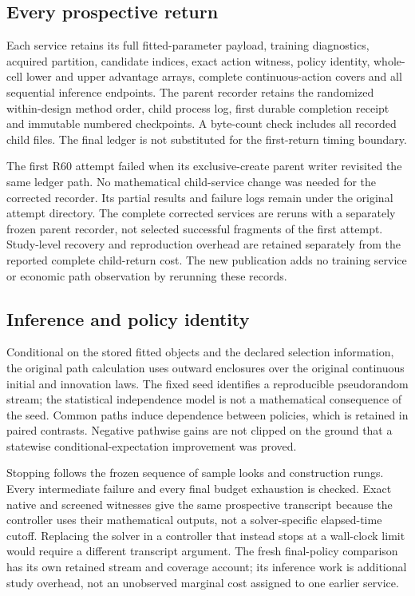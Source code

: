 \subsection{Every prospective return}

Each service retains its full fitted-parameter payload, training diagnostics, acquired partition, candidate indices, exact action witness, policy identity, whole-cell lower and upper advantage arrays, complete continuous-action covers and all sequential inference endpoints. The parent recorder retains the randomized within-design method order, child process log, first durable completion receipt and immutable numbered checkpoints. A byte-count check includes all recorded child files. The final ledger is not substituted for the first-return timing boundary.

The first R60 attempt failed when its exclusive-create parent writer revisited the same ledger path. No mathematical child-service change was needed for the corrected recorder. Its partial results and failure logs remain under the original attempt directory. The complete corrected services are reruns with a separately frozen parent recorder, not selected successful fragments of the first attempt. Study-level recovery and reproduction overhead are retained separately from the reported complete child-return cost. The new publication adds no training service or economic path observation by rerunning these records.

\subsection{Inference and policy identity}
Conditional on the stored fitted objects and the declared selection information, the original path calculation uses outward enclosures over the original continuous initial and innovation laws. The fixed seed identifies a reproducible pseudorandom stream; the statistical independence model is not a mathematical consequence of the seed. Common paths induce dependence between policies, which is retained in paired contrasts. Negative pathwise gains are not clipped on the ground that a statewise conditional-expectation improvement was proved.

Stopping follows the frozen sequence of sample looks and construction rungs. Every intermediate failure and every final budget exhaustion is checked. Exact native and screened witnesses give the same prospective transcript because the controller uses their mathematical outputs, not a solver-specific elapsed-time cutoff. Replacing the solver in a controller that instead stops at a wall-clock limit would require a different transcript argument. The fresh final-policy comparison has its own retained stream and coverage account; its inference work is additional study overhead, not an unobserved marginal cost assigned to one earlier service.

